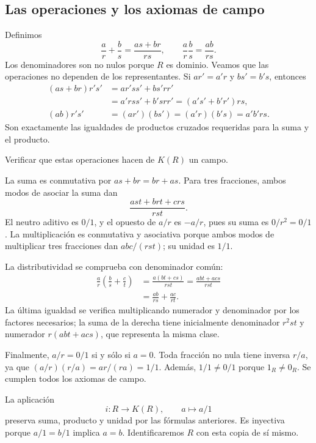 \subsection{Las operaciones y los axiomas de campo}\label{tema:18-1-2}
Definimos
\[
\frac ar+\frac bs=\frac{as+br}{rs},\qquad
\frac ar\frac bs=\frac{ab}{rs}.
\]
Los denominadores son no nulos porque $R$ es dominio. Veamos que las operaciones no dependen de los representantes. Si $ar'=a'r$ y $bs'=b's$, entonces
\[
\begin{aligned}
(as+br)r's'
&=ar'ss'+bs'rr'\\
&=a'rss'+b'srr'=(a's'+b'r')rs,\\
(ab)r's'&=(ar')(bs')=(a'r)(b's)=a'b'rs.
\end{aligned}
\]
Son exactamente las igualdades de productos cruzados requeridas para la suma y el producto.

\begin{ejer}\label{ejer:C18-campo}
Verificar que estas operaciones hacen de $K(R)$ un campo.
\end{ejer}
\begin{sol}
La suma es conmutativa por $as+br=br+as$. Para tres fracciones, ambos modos de asociar la suma dan
\[
\frac{ast+brt+crs}{rst}.
\]
El neutro aditivo es $0/1$, y el opuesto de $a/r$ es $-a/r$, pues su suma es $0/r^2=0/1$. La multiplicación es conmutativa y asociativa porque ambos modos de multiplicar tres fracciones dan $abc/(rst)$; su unidad es $1/1$.

La distributividad se comprueba con denominador común:
\[
\begin{aligned}
\frac ar\left(\frac bs+\frac ct\right)
&=\frac{a(bt+cs)}{rst}
=\frac{abt+acs}{rst}\\
&=\frac{ab}{rs}+\frac{ac}{rt}.
\end{aligned}
\]
La última igualdad se verifica multiplicando numerador y denominador por los factores necesarios; la suma de la derecha tiene inicialmente denominador $r^2st$ y numerador $r(abt+acs)$, que representa la misma clase.

Finalmente, $a/r=0/1$ si y sólo si $a=0$. Toda fracción no nula tiene inversa $r/a$, ya que $(a/r)(r/a)=ar/(ra)=1/1$. Además, $1/1\ne0/1$ porque $1_R\ne0_R$. Se cumplen todos los axiomas de campo.
\end{sol}
La aplicación
\[
i:R\longrightarrow K(R),\qquad a\longmapsto a/1
\]
preserva suma, producto y unidad por las fórmulas anteriores. Es inyectiva porque $a/1=b/1$ implica $a=b$. Identificaremos $R$ con esta copia de sí mismo.

